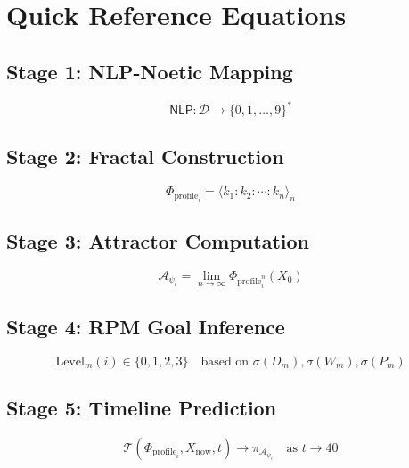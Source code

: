 \documentclass[11pt,twoside]{book}
\newcommand{\PsychAttractor}{\mathcal{A}_\psi}
\newcommand{\NLP}{\mathsf{NLP}}
\newcommand{\DigitalTrace}{\mathcal{D}}
\newcommand{\ProfileFrac}{\Phi_{\mathrm{profile}}}
\newcommand{\Timeline}{\mathcal{T}}
\begin{document}
\appendix

\chapter{Quick Reference Equations}
\label{app:quick-ref}

\section{Stage 1: NLP-Noetic Mapping}
\begin{equation}
    \NLP : \DigitalTrace \to \{0, 1, \ldots, 9\}^*
\end{equation}

\section{Stage 2: Fractal Construction}
\begin{equation}
    \ProfileFrac_i = \langle k_1 : k_2 : \cdots : k_n \rangle_n
\end{equation}

\section{Stage 3: Attractor Computation}
\begin{equation}
    \PsychAttractor_i = \lim_{n \to \infty} \ProfileFrac_i^n(X_0)
\end{equation}

\section{Stage 4: RPM Goal Inference}
\begin{equation}
    \mathrm{Level}_m(i) \in \{0, 1, 2, 3\} \quad \text{based on } \sigma(D_m), \sigma(W_m), \sigma(P_m)
\end{equation}

\section{Stage 5: Timeline Prediction}
\begin{equation}
    \Timeline(\ProfileFrac_i, X_{\text{now}}, t) \to \pi_{\PsychAttractor_i} \quad \text{as } t \to 40
\end{equation}
\end{document}
